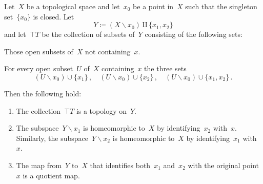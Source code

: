 \begin{proposition}
	\label{duplicating a point}
	Let~$X$ be a topological space and let~$x_0$ be a point in~$X$ such that the singleton set~$\{ x_0 \}$ is closed.
	Let
	\[
		Y ≔ ( X ∖ x_0 ) ⨿ \{ x_1, x_2 \}
	\]
	and let~$\top{T}$ be the collection of subsets of~$Y$ consisting of the following sets:
	\begin{itemize*}

		\item
			Those open subsets of~$X$ not containing~$x$.

		\item
			For every open subset~$U$ of~$X$ containing~$x$ the three sets
			\[
				(U ∖ x_0) ∪ \{ x_1 \} \,,
				\quad
				(U ∖ x_0) ∪ \{ x_2 \} \,,
				\quad
				(U ∖ x_0) ∪ \{ x_1, x_2 \} \,.
			\]

	\end{itemize*}
	Then the following hold:
	\begin{enumerate}

		\item
			The collection~$\top{T}$ is a topology on~$Y$.

		\item
			The subspace~$Y ∖ x_1$ is homeomorphic to~$X$ by identifying~$x_2$ with~$x$.
			Similarly, the subspace~$Y ∖ x_2$ is homeomorphic to~$X$ by identifying~$x_1$ with~$x$.

		\item
			The map from~$Y$ to~$X$ that identifies both~$x_1$ and~$x_2$ with the original point~$x$ is a quotient map.

	\end{enumerate}
\end{proposition}


